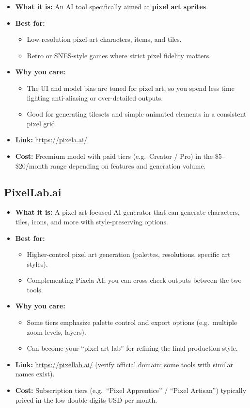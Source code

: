\documentclass[11pt]{article}
\begin{document}
\begin{itemize}
    \item \textbf{What it is:} An AI tool specifically aimed at \textbf{pixel art sprites}.
    \item \textbf{Best for:}
    \begin{itemize}
        \item Low-resolution pixel-art characters, items, and tiles.
        \item Retro or SNES-style games where strict pixel fidelity matters.
    \end{itemize}
    \item \textbf{Why you care:}
    \begin{itemize}
        \item The UI and model bias are tuned for pixel art, so you spend less time fighting anti-aliasing or over-detailed outputs.
        \item Good for generating tilesets and simple animated elements in a consistent pixel grid.
    \end{itemize}
    \item \textbf{Link:} \url{https://pixela.ai/}
    \item \textbf{Cost:} Freemium model with paid tiers (e.g.\ Creator / Pro) in the \$5--\$20/month range depending on features and generation volume.
\end{itemize}

\subsection{PixelLab.ai}

\begin{itemize}
    \item \textbf{What it is:} A pixel-art-focused AI generator that can generate characters, tiles, icons, and more with style-preserving options.
    \item \textbf{Best for:}
    \begin{itemize}
        \item Higher-control pixel art generation (palettes, resolutions, specific art styles).
        \item Complementing Pixela AI; you can cross-check outputs between the two tools.
    \end{itemize}
    \item \textbf{Why you care:}
    \begin{itemize}
        \item Some tiers emphasize palette control and export options (e.g.\ multiple zoom levels, layers).
        \item Can become your ``pixel art lab'' for refining the final production style.
    \end{itemize}
    \item \textbf{Link:} \url{https://pixellab.ai/} (verify official domain; some tools with similar names exist).
    \item \textbf{Cost:} Subscription tiers (e.g.\ ``Pixel Apprentice'' / ``Pixel Artisan'') typically priced in the low double-digits USD per month.
\end{itemize}
\end{document}
